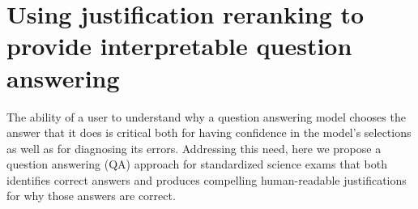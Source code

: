 \section{Using justification reranking to provide interpretable question answering}
\label{sec-cl2017:relatedwork}

The ability of a user to understand why a question answering model chooses the answer that it does is critical both for having confidence in the model's selections as well as for diagnosing its errors.  Addressing this need, here we propose a question answering (QA) approach for standardized science exams that both identifies correct answers and produces compelling human-readable justifications for why those answers are correct. 

%


